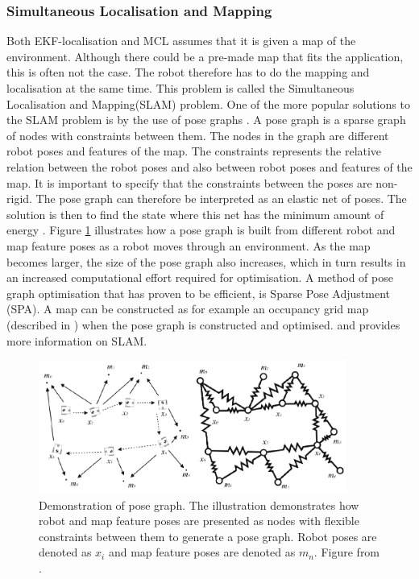 \subsubsection{Simultaneous Localisation and Mapping} \label{sec:T:AN:L:SLAM}
Both EKF-localisation and MCL assumes that it is given a map of the environment. Although there could be a pre-made map that fits the application, this is often not the case. The robot therefore has to do the mapping and localisation at the same time. This problem is called the Simultaneous Localisation and Mapping(SLAM) problem. One of the more popular solutions to the SLAM problem is by the use of pose graphs \cite{Konolige2010}. A pose graph is a sparse graph of nodes with constraints between them. The nodes in the graph are different robot poses and features of the map. The constraints represents the relative relation between the robot poses and also between robot poses and features of the map. It is important to specify that the constraints between the poses are non-rigid. The pose graph can therefore be interpreted as an elastic net of poses. The solution is then to find the state where this net has the minimum amount of energy \cite{SiegwartRoland2011Itam}. Figure \ref{fig:poseGraph} illustrates how a pose graph is built from different robot and map feature poses as a robot moves through an environment. As the map becomes larger, the size of the pose graph also increases, which in turn results in an increased computational effort required for optimisation. A method of pose graph optimisation that has proven to be efficient, is Sparse Pose Adjustment (SPA)\cite{Konolige2010}. A  map can be constructed as for example an occupancy grid map (described in \cite{ThrunSebastian2005Pr}) when the pose graph is constructed and optimised. \cite{SiegwartRoland2011Itam} and \cite{ThrunSebastian2005Pr} provides more information on SLAM.

\begin{figure}[htp]
  \centering
  \includegraphics[width = 0.9\textwidth]{Figures/figposeGraph.pdf}
  \caption{Demonstration of pose graph. The illustration demonstrates how robot and map feature poses are presented as nodes with flexible constraints between them to generate a pose graph. Robot poses are denoted as $x_i$ and map feature poses are denoted as $m_n$. Figure from \cite{SiegwartRoland2011Itam}.}
  \label{fig:poseGraph}
\end{figure}

